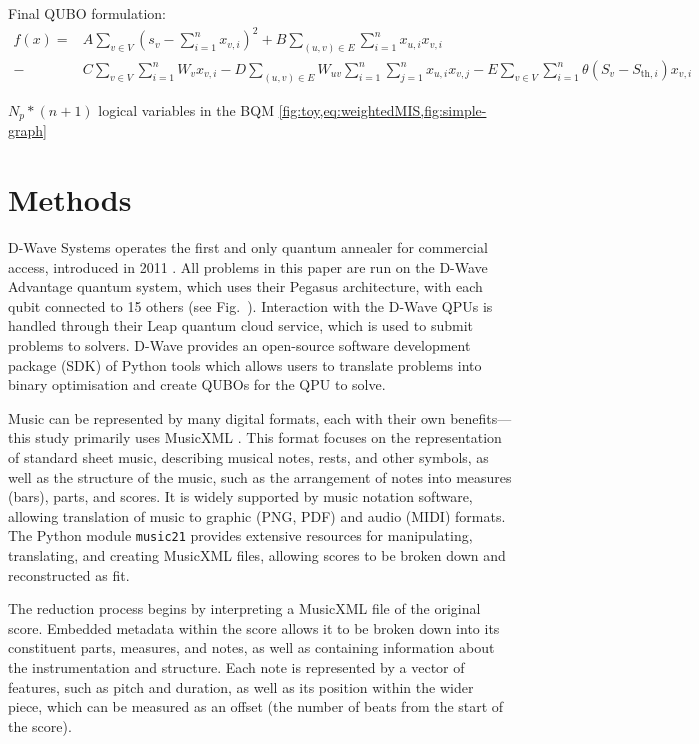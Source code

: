 \documentclass[12pt]{article}
\begin{document}
Final QUBO formulation:
\begin{align}
    f(x)=&A\sum_{v \in V}\left(s_v-\sum_{i=1}^{n} x_{v,i}\right)^2+B\sum_{(u,v) \in E}\sum_{i=1}^n x_{u,i}x_{v,i}\\-&C\sum_{v \in V}\sum_{i=1}^n W_vx_{v,i}-D\sum_{(u,v)\in E}W_{uv}\sum_{i=1}^n\sum_{j=1}^n x_{u,i}x_{v,j}-E\sum_{v \in V}\sum_{i=1}^n\theta(S_v-S_{\text{th},i})x_{v,i}
    \label{eq:weightedMIS}
\end{align}

$N_p * (n+1)$ logical variables in the BQM \cref{fig:toy,eq:weightedMIS,fig:simple-graph}


\section{Methods}

D-Wave Systems operates the first and only quantum annealer for commercial access, introduced in 2011 . All problems in this paper are run on the D-Wave Advantage quantum system, which uses their Pegasus architecture, with each qubit connected to 15 others (see Fig.\  ).
Interaction with the D-Wave QPUs is handled through their Leap quantum cloud service, which is used to submit problems to solvers. D-Wave provides an open-source software development package (SDK) of Python tools which allows users to translate problems into binary optimisation and create QUBOs for the QPU to solve.

Music can be represented by many digital formats, each with their own benefits—this study primarily uses MusicXML . This format focuses on the representation of standard sheet music, describing musical notes, rests, and other symbols, as well as the structure of the music, such as the arrangement of notes into measures (bars), parts, and scores. It is widely supported by music notation software, allowing translation of music to graphic (PNG, PDF) and audio (MIDI) formats. The Python module \verb|music21| provides extensive resources for manipulating, translating, and creating MusicXML files, allowing scores to be broken down and reconstructed as fit.

The reduction process begins by interpreting a MusicXML file of the original score. Embedded metadata within the score allows it to be broken down into its constituent parts, measures, and notes, as well as containing information about the instrumentation and structure. Each note is represented by a vector of features, such as pitch and duration, as well as its position within the wider piece, which can be measured as an offset (the number of beats from the start of the score).
\end{document}
